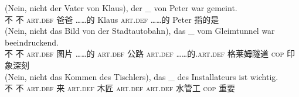 \eal
\label{ex-nounless-np-relational-noun}
\ex 
\gll (Nein, nicht der Vater von Klaus), der \_ von Peter war gemeint.\\
	\spacebr{}不 不  \textsc{art}.\textsc{def} 爸爸 ……的 Klaus \textsc{art}.\textsc{def} {} ……的 Peter \passivepst{} 指的是\\
\ex 
\gll (Nein, nicht das Bild von der Stadtautobahn), das \_ vom Gleimtunnel war beeindruckend.\\
	 \spacebr{}不 不  \textsc{art}.\textsc{def} 图片 ……的 \textsc{art}.\textsc{def} 公路 \textsc{art}.\textsc{def} {} ……的.\textsc{art}.\textsc{def} 格莱姆隧道 \textsc{cop} 印象深刻\\
\ex 
\gll (Nein, nicht das Kommen des Tischlers), das \_ des Installateurs ist wichtig.\\
	 \spacebr{}不 不  \textsc{art}.\textsc{def} 来 \textsc{art}.\textsc{def} 木匠 \textsc{art}.\textsc{def} {} \textsc{art}.\textsc{def} 水管工 \textsc{cop} 重要\\
\zl
%
%
